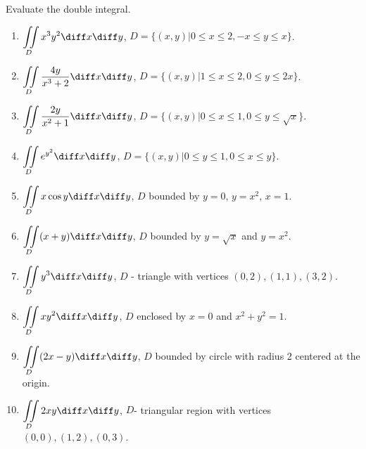 Evaluate the double integral.

\begin{enumerate}
\item $\displaystyle \iint\limits_{D} x^3y^2 \diff x \diff y $, $D=\{(x,y)| 0\leq x \leq 2, -x\leq y \leq x \}$.
\item $\displaystyle \iint\limits_{D} \frac{4y}{x^3+2}\diff x \diff y $, $D=\{(x,y)| 1\leq x\leq 2, 0 \leq y\leq 2x\}$.
\item $\displaystyle \iint\limits_{D}\frac{2y}{x^2+1} \diff x \diff y $, $D=\{(x,y)|0\leq x \leq 1, 0 \leq y \leq \sqrt{x} \}$.
\item $\displaystyle \iint\limits_{D}e^{y^2} \diff x \diff y $, $D=\{(x,y)|0\leq y \leq 1, 0\leq  x\leq y \}$.
\item $\displaystyle \iint\limits_{D} x\cos y \diff x \diff y $, $D$ bounded by $y=0$, $y=x^2$, $x=1$.
\item $\displaystyle \iint\limits_{D} (x+y)\diff x \diff y $, $D$ bounded by $y=\sqrt{x}$ and $y=x^2$.
\item $\displaystyle \iint\limits_{D}y^3 \diff x \diff y $, $D$ - triangle with vertices $(0,2), (1,1), (3,2)$.
\item $\displaystyle \iint\limits_{D} xy^2 \diff x \diff y $, $D$ enclosed by $x=0$ and $x^2+y^2=1$.
\item $\displaystyle \iint\limits_{D} (2x-y)\diff x \diff y $, $D$ bounded by circle with radius 2 centered at the origin.
\item $\displaystyle \iint\limits_{D} 2xy\diff x \diff y $, $D$- triangular region with vertices $(0,0), (1,2), (0,3)$.
\end{enumerate}